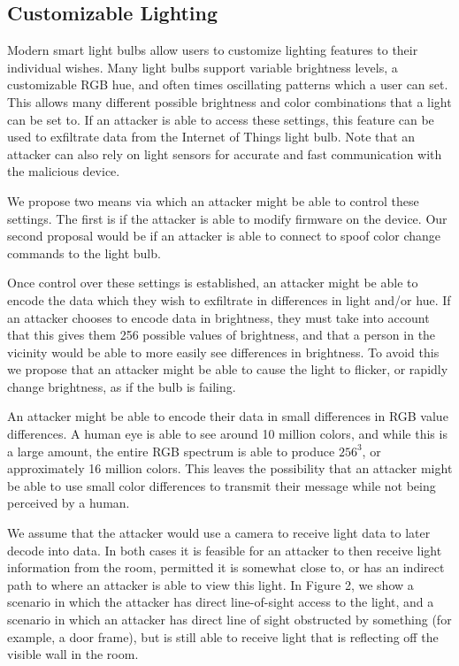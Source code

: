 \documentclass[conference]{IEEEtran}
\begin{document}
\subsection{Customizable Lighting}

Modern smart light bulbs allow users to customize lighting features to their individual wishes\cite{bt_speaker1}\cite{bt_speaker2}\cite{bt_light1}. Many light bulbs support variable brightness levels, a customizable RGB hue, and often times oscillating patterns which a user can set. This allows many different possible brightness and color combinations that a light can be set to. If an attacker is able to access these settings, this feature can be used to exfiltrate data from the Internet of Things light bulb. Note that an attacker can also rely on light sensors for accurate and fast communication with the malicious device.

We propose two means via which an attacker might be able to control these settings. The first is if the attacker is able to modify firmware on the device. Our second proposal would be if an attacker is able to connect to spoof color change commands to the light bulb.

Once control over these settings is established, an attacker might be able to encode the data which they wish to exfiltrate in differences in light and/or hue. If an attacker chooses to encode data in brightness, they must take into account that this gives them 256 possible values of brightness, and that a person in the vicinity would be able to more easily see differences in brightness. To avoid this we propose that an attacker might be able to cause the light to flicker, or rapidly change brightness, as if the bulb is failing.

An attacker might be able to encode their data in small differences in RGB value differences. A human eye is able to see around 10 million colors\cite{c1}\cite{c2}, and while this is a large amount, the entire RGB spectrum is able to produce \begin{math}256^{3}\end{math}, or approximately 16 million colors. This leaves the possibility that an attacker might be able to use small color differences to transmit their message while not being perceived by a human.

We assume that the attacker would use a camera to receive light data to later decode into data. In both cases it is feasible for an attacker to then receive light information from the room, permitted it is somewhat close to, or has an indirect path to where an attacker is able to view this light. In Figure 2, we show a scenario in which the attacker has direct line-of-sight access to the light, and a scenario in which an attacker has direct line of sight obstructed by something (for example, a door frame), but is still able to receive light that is reflecting off the visible wall in the room. 
\end{document}
